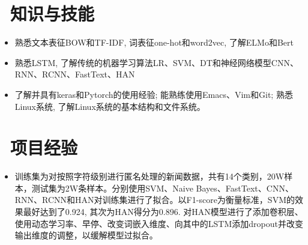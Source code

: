 \documentclass{resume}
\begin{document}



\section{\faCogs\ 知识与技能}
\begin{itemize}[parsep=0.5ex]
  \item {熟悉文本表征BOW和TF-IDF, 词表征one-hot和word2vec, 了解ELMo和Bert}
  \item {熟悉LSTM, 了解传统的机器学习算法LR、SVM、DT和神经网络模型CNN、RNN、RCNN、FastText、HAN}
  \item {了解并具有keras和Pytorch的使用经验; 能熟练使用Emacs、Vim和Git; 熟悉Linux系统, 了解Linux系统的基本结构和文件系统。}
\end{itemize}

\section{\faCogs\ 项目经验}
\begin{itemize}
  \item{训练集为对按照字符级别进行匿名处理的新闻数据，共有14个类别，20W样本，测试集为2W条样本。分别使用SVM、Naive Bayes、FastText、CNN、RNN、RCNN和HAN对训练集进行了拟合。以F1-score为衡量标准，SVM的效果最好达到了0.924, 其次为HAN得分为0.896. 对HAN模型进行了添加卷积层、使用动态学习率、早停、改变词嵌入维度、向其中的LSTM添加dropout并改变输出维度的调整，以缓解模型过拟合。}
\end{itemize}

\end{document}
